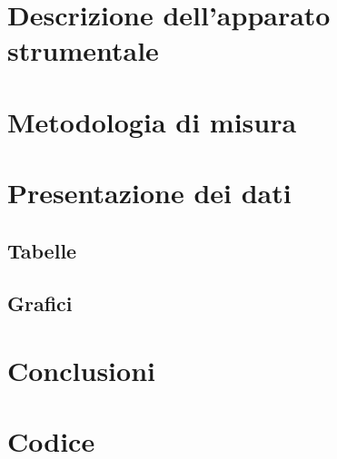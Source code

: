\documentclass[111pt,a4paper]{article} %
\begin{document}
\maketitle %
\tableofcontents %

\begin{abstract}
	
\end{abstract}

\section{Descrizione dell'apparato strumentale}
	

\section{Metodologia di misura}
	

\newpage
\section{Presentazione dei dati}			
	\subsection{Tabelle}
	
	
	\clearpage
	\subsection{Grafici}
	
		
\section{Conclusioni}
	
	
\section{Codice}
	
	
\end{document}
